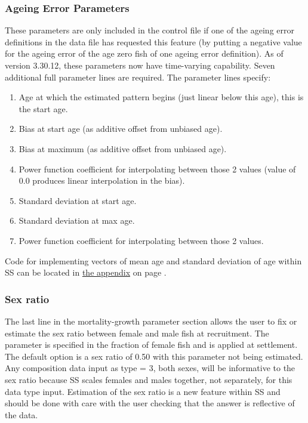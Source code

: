 \subsubsection{Ageing Error Parameters}
These parameters are only included in the control file if one of the ageing error definitions in the data file has requested this feature (by putting a negative value for the ageing error of the age zero fish of one ageing error definition). As of version 3.30.12, these parameters now have time-varying capability. Seven additional full parameter lines are required. The parameter lines specify:
\begin{enumerate}
	\item Age at which the estimated pattern begins (just linear below this age), this is the start age.
	\item Bias at start age (as additive offset from unbiased age).
	\item Bias at maximum (as additive offset from unbiased age).
	\item Power function coefficient for interpolating between those 2 values (value of 0.0 produces linear interpolation in the bias).
	\item Standard deviation at start age.
	\item Standard deviation at max age.
	\item Power function coefficient for interpolating between those 2 values.
\end{enumerate}

\noindent Code for implementing vectors of mean age and standard deviation of age within SS can be located in \hyperlink{AgeingError}{the appendix} on page \pageref{sec:codeappendix}.

\subsubsection{Sex ratio}
The last line in the mortality-growth parameter section allows the user to fix or estimate the sex ratio between female and male fish at recruitment.  The parameter is specified in the fraction of female fish and is applied at settlement. The default option is a sex ratio of 0.50 with this parameter not being estimated.  Any composition data input as type = 3, both sexes, will be informative to the sex ratio because SS scales females and males together, not separately, for this data type input. Estimation of the sex ratio is a new feature within SS and should be done with care with the user checking that the answer is reflective of the data.

